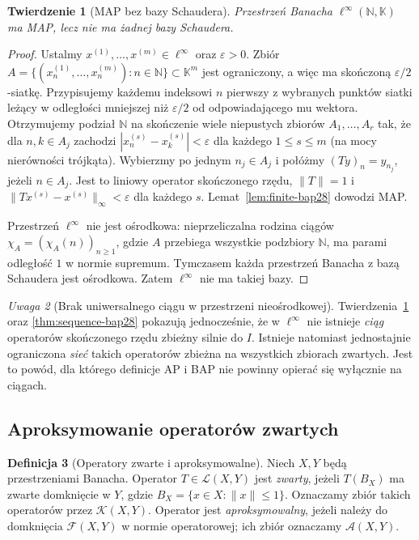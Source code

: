 \documentclass[11pt,a4paper]{article}
\numberwithin{equation}{section}
\theoremstyle{plain}
\newtheorem{twierdzenie}{Twierdzenie}[section]
\theoremstyle{definition}
\newtheorem{definicja}[twierdzenie]{Definicja}
\theoremstyle{remark}
\newtheorem{uwaga}[twierdzenie]{Uwaga}
\newcommand{\N}{\mathbb N}
\newcommand{\K}{\mathbb K}
\begin{document}
\begin{twierdzenie}[MAP bez bazy Schaudera]
\label{thm:linfty-map28}
Przestrzeń Banacha $\ell^\infty(\N,\K)$ ma MAP,
lecz nie ma żadnej bazy Schaudera.
\end{twierdzenie}
\begin{proof}
Ustalmy $x^{(1)},\ldots,x^{(m)}\in\ell^\infty$ oraz
$\varepsilon>0$. Zbiór
$A=\{(x^{(1)}_n,\ldots,x^{(m)}_n):n\in\N\}\subset\K^m$
jest ograniczony, a więc ma skończoną
$\varepsilon/2$-siatkę. Przypisujemy każdemu indeksowi $n$ pierwszy z wybranych
punktów siatki leżący w odległości mniejszej niż $\varepsilon/2$
od odpowiadającego mu wektora. Otrzymujemy podział $\N$
na skończenie wiele niepustych zbiorów $A_1,\ldots,A_r$ tak,
że dla $n,k\in A_j$ zachodzi
$|x_n^{(s)}-x_k^{(s)}|<\varepsilon$
dla każdego $1\le s\le m$ (na mocy nierówności trójkąta).
Wybierzmy po jednym $n_j\in A_j$ i połóżmy
$(Ty)_n=y_{n_j}$, jeżeli $n\in A_j$.
Jest to liniowy operator skończonego rzędu,
$\|T\|=1$ i
$\|Tx^{(s)}-x^{(s)}\|_\infty<\varepsilon$ dla każdego $s$.
Lemat~\ref{lem:finite-bap28} dowodzi MAP.

Przestrzeń $\ell^\infty$ nie jest ośrodkowa:
nieprzeliczalna rodzina ciągów $\chi_A=(\chi_A(n))_{n\ge1}$,
gdzie $A$ przebiega wszystkie podzbiory $\N$,
ma parami odległość $1$ w normie supremum.
Tymczasem każda przestrzeń Banacha z bazą Schaudera
jest ośrodkowa. Zatem $\ell^\infty$ nie ma takiej bazy.
\end{proof}

\begin{uwaga}[Brak uniwersalnego ciągu w przestrzeni nieośrodkowej]
\label{rem:linfty-sequence28}
Twierdzenia~\ref{thm:linfty-map28} oraz
\ref{thm:sequence-bap28} pokazują jednocześnie, że
w $\ell^\infty$ nie istnieje \emph{ciąg} operatorów
skończonego rzędu zbieżny silnie do $I$.
Istnieje natomiast jednostajnie ograniczona \emph{sieć}
takich operatorów zbieżna na wszystkich zbiorach zwartych.
Jest to powód, dla którego definicje AP i BAP nie powinny
opierać się wyłącznie na ciągach.
\end{uwaga}

\subsection{Aproksymowanie operatorów zwartych}

\begin{definicja}[Operatory zwarte i aproksymowalne]
\label{def:compact-approximable28}
Niech $X,Y$ będą przestrzeniami Banacha.
Operator $T\in\mathcal L(X,Y)$ jest \emph{zwarty},
jeżeli $T(B_X)$ ma zwarte domknięcie w $Y$, gdzie
$B_X=\{x\in X:\|x\|\le1\}$.
Oznaczamy zbiór takich operatorów przez
$\mathcal K(X,Y)$. Operator jest \emph{aproksymowalny},
jeżeli należy do domknięcia $\mathcal F(X,Y)$
w normie operatorowej; ich zbiór oznaczamy
$\mathcal A(X,Y)$.
\end{definicja}
\end{document}
